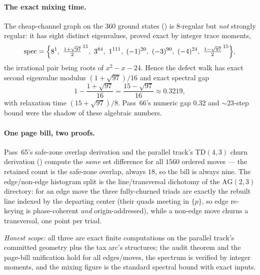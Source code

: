 \documentclass[11pt]{article}
\begin{document}
\paragraph{The exact mixing time.}  The cheap-channel graph on the \(360\)
ground states () is \(8\)-regular
but \emph{not} strongly regular: it has eight distinct eigenvalues, proved
exact by integer trace moments,
\[
  \mathrm{spec} = \Bigl\{8^{1},\ \tfrac{1+\sqrt{97}}{2}^{\,15},\ 3^{84},\ 1^{111},\ (-1)^{20},\ (-3)^{90},\ (-4)^{24},\ \tfrac{1-\sqrt{97}}{2}^{\,15}\Bigr\},
\]
the irrational pair being roots of \(x^2-x-24\).  Hence the defect walk has
exact second eigenvalue modulus \((1+\sqrt{97})/16\) and exact spectral gap
\[
  1-\frac{1+\sqrt{97}}{16}=\frac{15-\sqrt{97}}{16}\approx 0.3219,
\]
with relaxation time \((15+\sqrt{97})/8\).  Pass~66's numeric gap \(0.32\) and
\(\sim23\)-step bound were the shadow of these algebraic numbers.

\paragraph{One page bill, two proofs.}  Pass~65's safe-zone overlap derivation
and the parallel track's TD\((4,3)\) churn derivation
() compute the \emph{same} set
difference for all \(1560\) ordered moves --- the retained count is the
safe-zone overlap, always \(18\), so the bill is always nine.  The edge/non-edge
histogram split is the line/transversal dichotomy of the \(\mathrm{AG}(2,3)\)
directory: for an edge move the three fully-churned triads are exactly the
rebuilt line indexed by the departing center (their quads meeting in
\(\{p\}\), so edge re-keying is phase-coherent \emph{and} origin-addressed),
while a non-edge move churns a transversal, one point per triad.

\emph{Honest scope:} all three are exact finite computations on the parallel
track's committed geometry plus the tax arc's structures; the audit theorem and
the page-bill unification hold for all edges/moves, the spectrum is verified by
integer moments, and the mixing figure is the standard spectral bound with exact
inputs.














\end{document}
